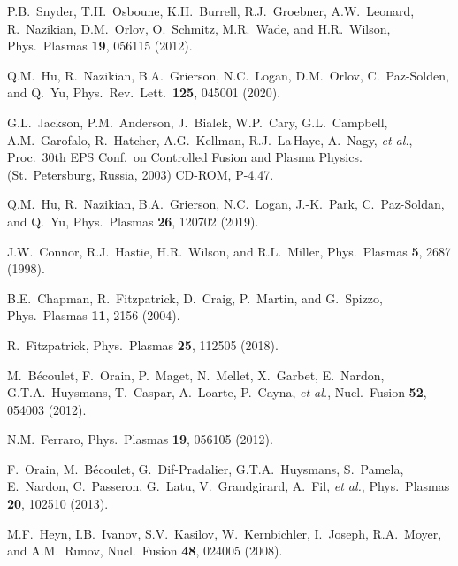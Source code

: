 \documentclass[12pt,prb,aps]{revtex4-1}
\begin{document}
\begin{thebibliography}{99}
 P.B.~Snyder, T.H.~Osboune, K.H.~Burrell, R.J.~Groebner, A.W.~Leonard, R.~Nazikian, D.M.~Orlov, O.~Schmitz, M.R.~Wade, and H.R.~Wilson, 
 Phys.\ Plasmas {\bf 19}, 056115 (2012).

 Q.M.~Hu, R.~Nazikian, B.A.~Grierson, N.C.~Logan, D.M.~Orlov, C.~Paz-Solden, and Q.~Yu, 
Phys.\ Rev.\ Lett.\ {\bf 125}, 045001 (2020).

 G.L.~Jackson, P.M.~Anderson, J.~Bialek, W.P.~Cary, G.L.~Campbell, A.M.~Garofalo,  R.~Hatcher, A.G.~Kellman, R.J.~La\,Haye, A.~Nagy, {\em et al.},  
Proc.\ 30th EPS Conf.\ on Controlled Fusion and Plasma Physics. (St.\ Petersburg, Russia, 2003) CD-ROM, P-4.47.

 Q.M.~Hu,  R.~Nazikian,  B.A.~Grierson,  N.C.~Logan,  J.-K.~Park,  C.~Paz-Soldan, and Q.~Yu, Phys.\ Plasmas {\bf 26}, 120702 (2019).


 J.W.~Connor,  R.J.~Hastie, H.R.~Wilson, and R.L.~Miller, Phys.\ Plasmas  {\bf 5}, 2687 (1998).

 B.E.~Chapman, R.~Fitzpatrick, D.~Craig, P.~Martin, and G.~Spizzo, Phys.\ Plasmas {\bf 11}, 2156 (2004).

 R.~Fitzpatrick, Phys.\ Plasmas {\bf 25}, 112505 (2018).

 M.~B\'{e}coulet, F.~Orain, P.~Maget, N.~Mellet, X.~Garbet, E.~Nardon, G.T.A.~Huysmans, T.~Caspar, A.~Loarte,  P.~Cayna, {\em et al.}, 
Nucl.\ Fusion {\bf 52}, 054003  (2012).

 N.M.~Ferraro, Phys.\ Plasmas {\bf 19}, 056105  (2012).

 F.~Orain, M.~B\'{e}coulet, G.~Dif-Pradalier, G.T.A.~Huysmans, S.~Pamela,   E.~Nardon, C.~Passeron, G.~Latu, V.~Grandgirard, A.~Fil, {\em et al.}, 
Phys.\ Plasmas {\bf 20}, 102510 (2013). 

 M.F.~Heyn, I.B.~Ivanov, S.V.~Kasilov, W.~Kernbichler, I.~Joseph, R.A.~Moyer,  and A.M.~Runov, Nucl.\ Fusion {\bf 48}, 024005 (2008). 

\end{thebibliography}

\newpage

\end{document}
